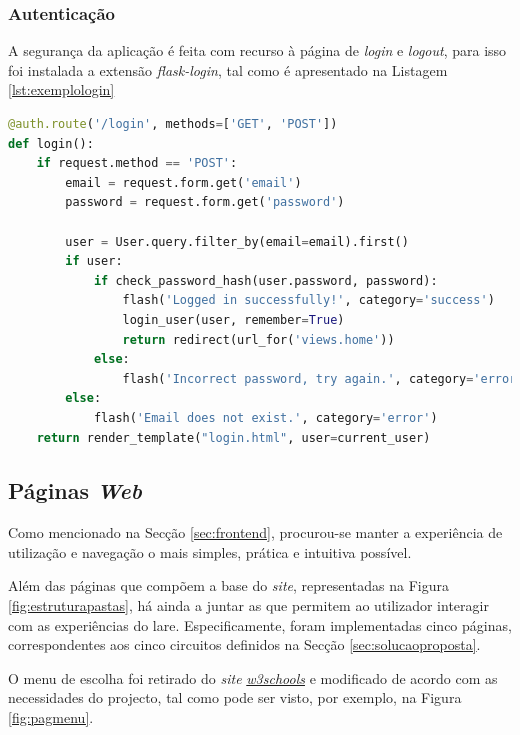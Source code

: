 \subsubsection{Autenticação}
A segurança da aplicação é feita com recurso à página de \textit{login} e \textit{logout}, para isso foi instalada a extensão \textit{flask-login}, tal como é apresentado na Listagem \ref{lst:exemplologin}

\begin{minipage}{0.9\linewidth}
	\begin{lstlisting}[language=Python, caption=Exemplo autenticação \textit{login}, label=lst:exemplologin]
@auth.route('/login', methods=['GET', 'POST'])
def login():
    if request.method == 'POST':
        email = request.form.get('email')
        password = request.form.get('password')

        user = User.query.filter_by(email=email).first()
        if user:
            if check_password_hash(user.password, password):
                flash('Logged in successfully!', category='success')
                login_user(user, remember=True)
                return redirect(url_for('views.home'))
            else:
                flash('Incorrect password, try again.', category='error')
        else:
            flash('Email does not exist.', category='error')
    return render_template("login.html", user=current_user) 
\end{lstlisting}
\end{minipage}

\subsection{Páginas \textit{Web}}
\label{sec:paginas}
Como mencionado na Secção \ref{sec:frontend}, procurou-se manter a experiência de utilização e navegação o mais simples, prática e intuitiva possível.

Além das páginas que compõem a base do \textit{site}, representadas na Figura \ref{fig:estruturapastas}, há ainda a juntar as que permitem ao utilizador interagir com as experiências do \acrshort{lare}. Especificamente, foram implementadas cinco páginas, correspondentes aos cinco circuitos definidos na Secção \ref{sec:solucaoproposta}.

O menu de escolha foi retirado do \textit{site} \href{https://www.w3schools.com/howto/howto_js_vertical_tabs.asp}{\textit{w3schools}} e modificado de acordo com as necessidades do projecto, tal como pode ser visto, por exemplo, na Figura \ref{fig:pagmenu}.

